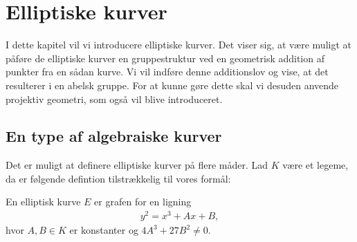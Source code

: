 \chapter{Elliptiske kurver}
I dette kapitel vil vi introducere elliptiske kurver.
Det viser sig, at være muligt at påføre de elliptiske kurver en gruppestruktur ved en geometrisk addition af punkter fra en sådan kurve. Vi vil indføre denne additionslov og vise, at det resulterer i en abelsk gruppe. For at kunne gøre dette skal vi desuden anvende projektiv geometri, som også vil blive introduceret.

\section{En type af algebraiske kurver}
Det er muligt at definere elliptiske kurver på flere måder. Lad $K$ være et legeme, da er følgende defintion tilstrækkelig til vores formål:

\begin{definition}
En elliptisk kurve $E$ er grafen for en ligning
\begin{align}
	\label{elliptic_curve}
	y^2 = x^3 + Ax + B,
\end{align}
hvor $A, B \in K$ er konstanter og $4A^3 + 27B^2 \neq 0$. 
\end{definition}

